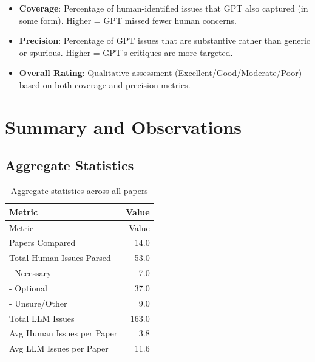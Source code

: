 \documentclass[
  11pt,
  letterpaper,
  DIV=11,
  numbers=noendperiod]{scrreprt}
\providecommand{\tightlist}{%
  \setlength{\itemsep}{0pt}\setlength{\parskip}{0pt}}
\begin{document}
\begin{tcolorbox}[enhanced jigsaw, colback=white, title=\textcolor{quarto-callout-note-color}{\faInfo}\hspace{0.5em}{Interpretation Guide}, bottomrule=.15mm, coltitle=black, left=2mm, colframe=quarto-callout-note-color-frame, toptitle=1mm, toprule=.15mm, titlerule=0mm, breakable, leftrule=.75mm, colbacktitle=quarto-callout-note-color!10!white, bottomtitle=1mm, arc=.35mm, rightrule=.15mm, opacityback=0, opacitybacktitle=0.6]

\begin{itemize}
\tightlist
\item
  \textbf{Coverage}: Percentage of human-identified issues that GPT also
  captured (in some form). Higher = GPT missed fewer human concerns.
\item
  \textbf{Precision}: Percentage of GPT issues that are substantive
  rather than generic or spurious. Higher = GPT's critiques are more
  targeted.
\item
  \textbf{Overall Rating}: Qualitative assessment
  (Excellent/Good/Moderate/Poor) based on both coverage and precision
  metrics.
\end{itemize}

\end{tcolorbox}

\section{Summary and Observations}\label{summary-and-observations}

\subsection{Aggregate Statistics}\label{aggregate-statistics}

\begin{longtable}[]{@{}lr@{}}
\caption{Aggregate statistics across all
papers}\label{tbl-aggregate-stats}\tabularnewline
\toprule\noalign{}
Metric & Value \\
\midrule\noalign{}
\endfirsthead
\toprule\noalign{}
Metric & Value \\
\midrule\noalign{}
\endhead
\bottomrule\noalign{}
\endlastfoot
Papers Compared & 14.0 \\
Total Human Issues Parsed & 53.0 \\
- Necessary & 7.0 \\
- Optional & 37.0 \\
- Unsure/Other & 9.0 \\
Total LLM Issues & 163.0 \\
Avg Human Issues per Paper & 3.8 \\
Avg LLM Issues per Paper & 11.6 \\
\end{longtable}
\end{document}
